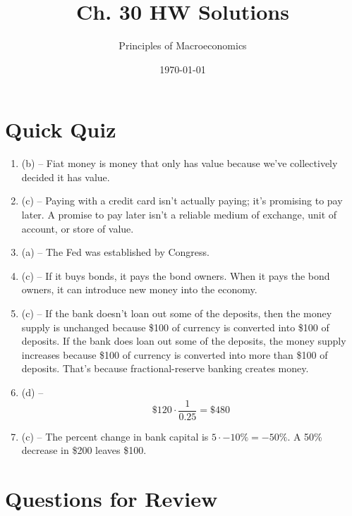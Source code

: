 \documentclass{article}
\title{Ch. 30 HW Solutions}
\author{Principles of Macroeconomics}
\date{\today}
\begin{document}
\maketitle

\section*{Quick Quiz}

\begin{enumerate}

\item (b) -- Fiat money is money that only has value because we've collectively decided it has value.

\item (c) -- Paying with a credit card isn't actually paying; it's promising to pay later. A promise to pay later isn't a reliable medium of exchange, unit of account, or store of value.

\item (a) -- The Fed was established by Congress.

\item (c) -- If it buys bonds, it pays the bond owners. When it pays the bond owners, it can introduce new money into the economy.

\item (c) -- If the bank doesn't loan out some of the deposits, then the money supply is unchanged because \$100 of currency is converted into \$100 of deposits. If the bank does loan out some of the deposits, the money supply increases because \$100 of currency is converted into more than \$100 of deposits. That's because fractional-reserve banking creates money.

\item (d) -- \[ \$120 \cdot \frac{1}{0.25} = \$480 \]

\item (c) -- The percent change in bank capital is $5 \cdot -10\% = -50\%$. A 50\% decrease in \$200 leaves \$100.

\end{enumerate}

\section*{Questions for Review}
\end{document}
